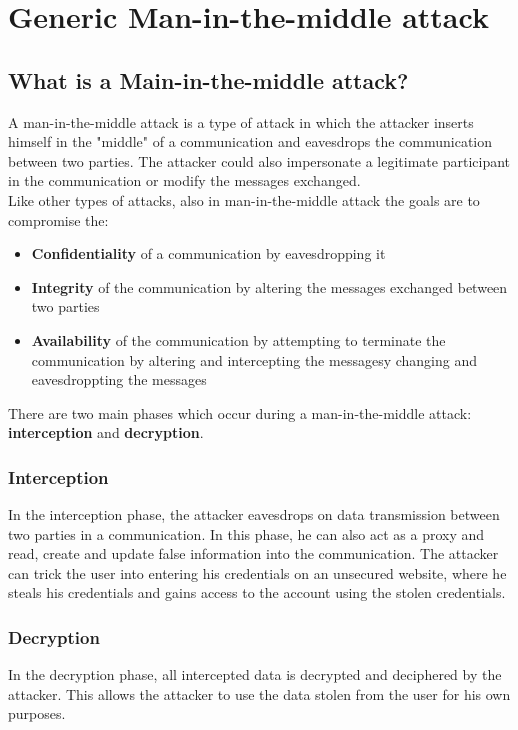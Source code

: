 
\chapter{Generic Man-in-the-middle attack}
\section{What is a Main-in-the-middle attack?}
A man-in-the-middle attack is a type of attack in which the attacker inserts himself in the "middle" of a communication and eavesdrops the communication between two parties. 
The attacker could also impersonate a legitimate participant in the communication or modify the messages exchanged. \\
Like other types of attacks, also in man-in-the-middle attack the goals are to compromise the: 
\begin{itemize}
    \item \textbf{Confidentiality} of a communication by eavesdropping it 
    \item \textbf{Integrity} of the communication by altering the messages exchanged between two parties
    \item \textbf{Availability} of the communication by attempting to terminate the communication by altering and intercepting the messagesy changing and eavesdroppting the messages
\end{itemize}
There are two main phases which occur during a man-in-the-middle attack: \textbf{interception} and \textbf{decryption}. 

\subsection{Interception}
In the interception phase, the attacker eavesdrops on data transmission between two parties in a communication. 
In this phase, he can also act as a proxy and read, create and update false information into the communication. 
The attacker can trick the user into entering his credentials on an unsecured website, where he steals his credentials and gains access to the account using the stolen credentials.

\subsection{Decryption}
In the decryption phase, all intercepted data is decrypted and deciphered by the attacker.
This allows the attacker to use the data stolen from the user for his own purposes.



